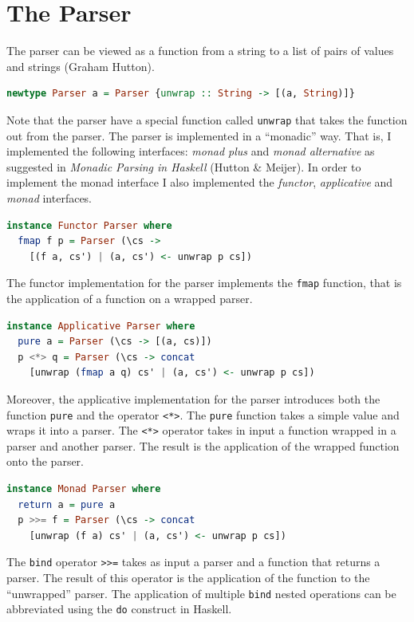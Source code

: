\documentclass[12pt,a4paper]{article}
\begin{document}
\section*{The Parser}
The parser can be viewed as a function from a string to a list of pairs of values and strings (Graham Hutton).
\begin{lstlisting}[language=Haskell, style=custom-style]
newtype Parser a = Parser {unwrap :: String -> [(a, String)]}
\end{lstlisting}
Note that the parser have a special function called \texttt{unwrap} that takes the function out from the parser.
The parser is implemented in a ``monadic'' way.
That is, I implemented the following interfaces: \textit{monad plus} and \textit{monad alternative} as suggested in \textit{Monadic Parsing in Haskell} (Hutton \& Meijer).
In order to implement the monad interface I also implemented the \textit{functor}, \textit{applicative} and \textit{monad} interfaces.
\begin{lstlisting}[language=Haskell, style=custom-style]
instance Functor Parser where
  fmap f p = Parser (\cs ->
    [(f a, cs') | (a, cs') <- unwrap p cs])
\end{lstlisting}
The functor implementation for the parser implements the \texttt{fmap} function, that is the application of a function on a wrapped parser.
\begin{lstlisting}[language=Haskell, style=custom-style]
instance Applicative Parser where
  pure a = Parser (\cs -> [(a, cs)])
  p <*> q = Parser (\cs -> concat
    [unwrap (fmap a q) cs' | (a, cs') <- unwrap p cs])
\end{lstlisting}
Moreover, the applicative implementation for the parser introduces both the function \texttt{pure} and the operator \texttt{<*>}.
The \texttt{pure} function takes a simple value and wraps it into a parser.
The \texttt{<*>} operator takes in input a function wrapped in a parser and another parser.
The result is the application of the wrapped function onto the parser.
\begin{lstlisting}[language=Haskell, style=custom-style]
instance Monad Parser where
  return a = pure a
  p >>= f = Parser (\cs -> concat
    [unwrap (f a) cs' | (a, cs') <- unwrap p cs])
\end{lstlisting}
The \texttt{bind} operator \texttt{>>=} takes as input a parser and a function that returns a parser.
The result of this operator is the application of the function to the ``unwrapped'' parser.
The application of multiple \texttt{bind} nested operations can be abbreviated using the \texttt{do} construct in Haskell.
\end{document}

